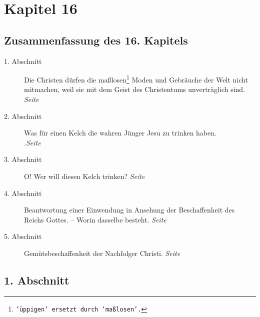 \chapter{Kapitel 16} \label{kap16}
\section{Zusammenfassung des 16. Kapitels}

\begin{description}
\item[1. Abschnitt] Die Christen dürfen die maßlosen\footnote{\texttt{'üppigen'
ersetzt durch 'maßlosen'.}}
Moden und Gebräuche der Welt
nicht mitmachen, weil sie mit dem Geist des Christentums unverträglich sind.
\dotfill \textit{Seite~\pageref{kap16_ab1}}\\
\item[2. Abschnitt] Was für einen Kelch die wahren Jünger Jesu zu trinken haben.\\
.\dotfill \textit{Seite~\pageref{kap16_ab2}}\\
\item[3. Abschnitt] O! Wer will diesen Kelch trinken?
\dotfill \textit{Seite~\pageref{kap16_ab3}}\\
\item[4. Abschnitt] Beantwortung einer Einwendung in Ansehung der Beschaffenheit
des Reichs Gottes. -- Worin dasselbe besteht.
\dotfill \textit{Seite~\pageref{kap16_ab4}}\\
\item[5. Abschnitt] Gemütsbeschaffenheit der Nachfolger Christi.
\dotfill \textit{Seite~\pageref{kap16_ab5}}\\

\end{description}

\newpage

\section{1. Abschnitt} \label{kap16_ab1}

